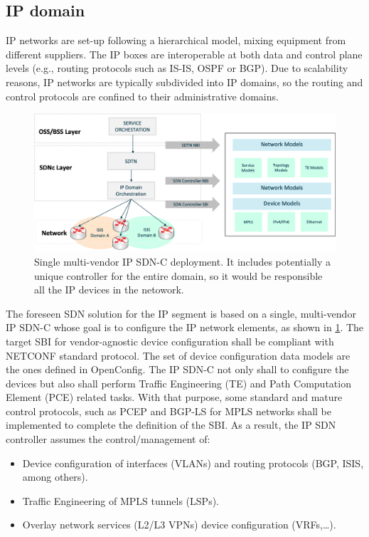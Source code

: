 \documentclass[a4paper,fleqn]{cas-dc}
\begin{document}
\subsection {IP domain}
\label{section:ip}
IP networks are set-up following a hierarchical model, mixing equipment from different suppliers. The IP boxes are interoperable at both data and control plane levels (e.g., routing protocols such as IS-IS, OSPF or BGP). Due to scalability reasons, IP networks are typically subdivided into IP domains, so the routing and control protocols are confined to their administrative domains.

\begin{figure}
	\centering
		\includegraphics[scale=0.5]{figs/ifusion_multidomain_2.png}
	\caption{Single multi-vendor IP SDN-C deployment. It includes potentially a unique controller for the entire domain, so it would be responsible all the IP devices in the netowork.}
	\label{FIG:2}
\end{figure}

The foreseen SDN solution for the IP segment is based on a single, multi-vendor IP SDN-C whose goal is to configure the IP network elements, as shown in \cref{FIG:2}. The target SBI for vendor-agnostic device configuration shall be compliant with NETCONF standard protocol. The set of device configuration data models are the ones defined in OpenConfig. 
The IP SDN-C not only shall to configure the devices but also shall perform Traffic Engineering (TE) and Path Computation Element (PCE) related tasks. With that purpose, some standard and mature control protocols, such as PCEP and BGP-LS for MPLS networks shall be implemented to complete the definition of the SBI. As a result, the IP SDN controller  assumes the control/management of:
\begin{itemize}
\item Device configuration of interfaces (VLANs) and routing protocols (BGP, ISIS, among others).
\item Traffic Engineering of MPLS tunnels (LSPs). 
\item Overlay network services (L2/L3 VPNs) device configuration (VRFs,\dots).
\end{itemize}
\end{document}
